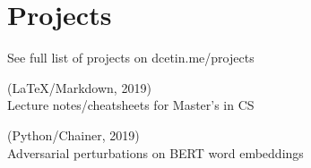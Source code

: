 \section{Projects}

See full list of projects on dcetin.me/projects
\vspace{\medskipamount}

\begin{minipage}[t]{0.5\textwidth}

\begin{denseouterlist}
\item
    (LaTeX/Markdown, 2019) \\
    Lecture notes/cheatsheets for Master's in CS
\end{denseouterlist}

\end{minipage}%
\begin{minipage}[t]{0.5\textwidth}

\begin{denseouterlist}
\item
    (Python/Chainer, 2019) \\
    Adversarial perturbations on BERT word embeddings
\end{denseouterlist}

\end{minipage}
